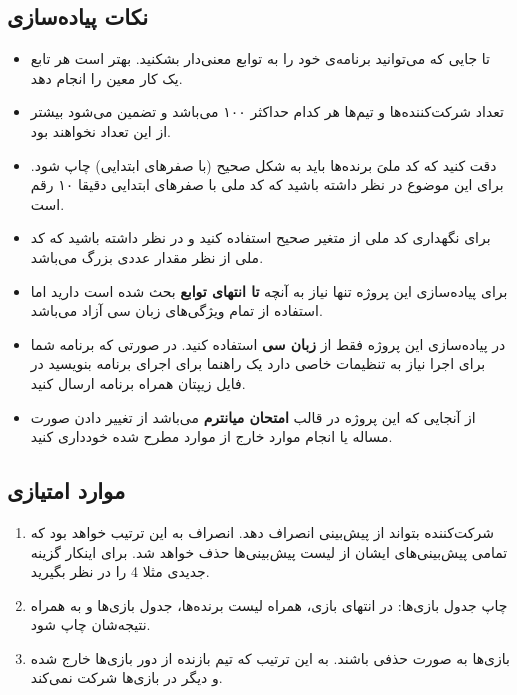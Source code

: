 \documentclass[../main.tex]{subfiles}
\begin{document}
\subsection{نکات پیاده‌سازی}

\begin{itemize}
    \item تا جایی که می‌توانید برنامه‌ی خود را به توابع معنی‌دار بشکنید. بهتر است هر تابع یک کار معین را انجام دهد.
    \item تعداد شرکت‌کننده‌ها و تیم‌ها هر کدام حداکثر ۱۰۰ می‌باشد و تضمین می‌شود بیشتر از این تعداد نخواهند بود.
    \item دقت کنید که کد ملیَ برنده‌ها باید به شکل صحیح (با صفرهای ابتدایی) چاپ شود. برای این موضوع در نظر داشته باشید که کد ملی با صفرهای ابتدایی دقیقا ۱۰ رقم است.
    \item برای نگهداری کد ملی از متغیر صحیح استفاده کنید و در نظر داشته باشید که کد ملی از نظر مقدار عددی بزرگ می‌باشد.
    \item برای پیاده‌سازی این پروژه تنها نیاز به آنچه \textbf{تا انتهای توابع} بحث شده است دارید اما استفاده از تمام ویژگی‌های زبان سی آزاد می‌باشد.
    \item در پیاده‌سازی این پروژه فقط از \textbf{زبان سی} استفاده کنید. در صورتی که برنامه شما برای اجرا نیاز به تنظیمات خاصی دارد یک راهنما برای اجرای برنامه بنویسید در فایل زیپتان همراه برنامه ارسال کنید.
    \item از آنجایی که این پروژه در قالب \textbf{امتحان میانترم} می‌باشد از تغییر دادن صورت مساله یا انجام موارد خارج از موارد مطرح شده خودداری کنید.
\end{itemize}

\subsection{موارد امتیازی}

\begin{enumerate}
    \item شرکت‌کننده بتواند از پیش‌بینی انصراف دهد. انصراف به این ترتیب خواهد بود که تمامی پیش‌بینی‌های ایشان از لیست پیش‌بینی‌ها حذف خواهد شد. برای اینکار گزینه جدیدی مثلا 4 را در نظر بگیرید.
    \item چاپ جدول بازی‌ها: در انتهای بازی، همراه لیست برنده‌ها، جدول بازی‌ها و به همراه نتیجه‌شان چاپ شود.
    \item بازی‌ها به صورت حذفی باشند. به این ترتیب که تیم بازنده از دور بازی‌ها خارج شده و دیگر در بازی‌ها شرکت نمی‌کند.
\end{enumerate}
\end{document}
